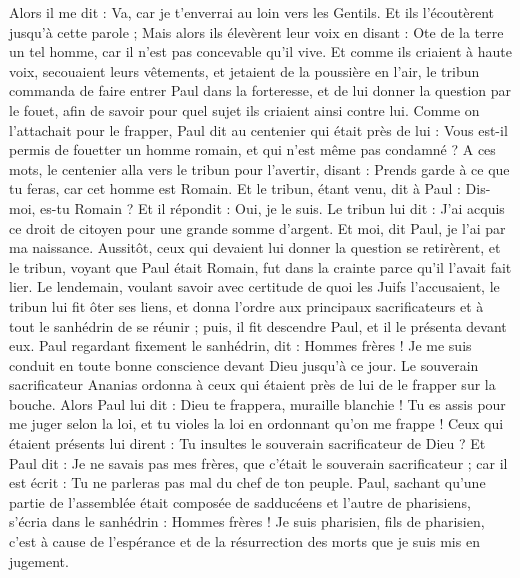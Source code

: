 \begin{multicols}{2}
Alors il me dit : Va, car je t'enverrai au loin vers les Gentils.
Et ils l'écoutèrent jusqu'à cette parole ; Mais alors ils élevèrent leur voix en disant : Ote de la terre un tel homme, car il n'est pas concevable qu'il vive.
Et comme ils criaient à haute voix, secouaient leurs vêtements, et jetaient de la poussière en l'air,
le tribun commanda de faire entrer Paul dans la forteresse, et de lui donner la question par le fouet, afin de savoir pour quel sujet ils criaient ainsi contre lui.
Comme on l’attachait pour le frapper, Paul dit au centenier qui était près de lui : Vous est-il permis de fouetter un homme romain, et qui n'est même pas condamné ?
A ces mots, le centenier alla vers le tribun pour l'avertir, disant : Prends garde à ce que tu feras, car cet homme est Romain.
Et le tribun, étant venu, dit à Paul : Dis-moi, es-tu Romain ? Et il répondit : Oui, je le suis.
Le tribun lui dit : J'ai acquis ce droit de citoyen pour une grande somme d’argent. Et moi, dit Paul, je l'ai par ma naissance.
Aussitôt, ceux qui devaient lui donner la question se retirèrent, et le tribun, voyant que Paul était Romain, fut dans la crainte parce qu’il l’avait fait lier.
Le lendemain, voulant savoir avec certitude de quoi les Juifs l’accusaient, le tribun lui fit ôter ses liens, et donna l’ordre aux principaux sacrificateurs et à tout le sanhédrin de se réunir ; puis, il fit descendre Paul, et il le présenta devant eux.
\VerseOne{}Paul regardant fixement le sanhédrin, dit : Hommes frères ! Je me suis conduit en toute bonne conscience devant Dieu jusqu'à ce jour.
Le souverain sacrificateur Ananias ordonna à ceux qui étaient près de lui de le frapper sur la bouche.
Alors Paul lui dit : Dieu te frappera, muraille blanchie ! Tu es assis pour me juger selon la loi, et tu violes la loi en ordonnant qu’on me frappe !
Ceux qui étaient présents lui dirent : Tu insultes le souverain sacrificateur de Dieu ?
Et Paul dit : Je ne savais pas mes frères, que c’était le souverain sacrificateur ; car il est écrit : Tu ne parleras pas mal du chef de ton peuple.
Paul, sachant qu'une partie de l’assemblée était composée de sadducéens et l'autre de pharisiens, s'écria dans le sanhédrin : Hommes frères ! Je suis pharisien, fils de pharisien, c’est à cause de l’espérance et de la résurrection des morts que je suis mis en jugement.

\end{multicols}
